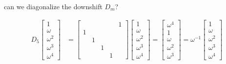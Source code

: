 \documentclass[10pt,
               svgnames,
               hyperref={colorlinks,citecolor=DeepPink4,linkcolor=FireBrick,urlcolor=Maroon},
               usepdftitle=false]{beamer}
\begin{document}
\begin{frame}{can we diagonalize the downshift $D_m$?}
\begin{itemize}
{\begin{align*}
D_5 \begin{bmatrix} 1 \\ \omega \\ \omega^2 \\ \omega^3 \\ \omega^4 \end{bmatrix} &= \begin{bmatrix} & & & & 1 \\ 1 & & & & \\ & 1 & & & \\ & & 1 & & \\ & & & 1 & \end{bmatrix} \begin{bmatrix} 1 \\ \omega \\ \omega^2 \\ \omega^3 \\ \omega^4 \end{bmatrix} = \begin{bmatrix} \omega^4 \\ 1 \\ \omega \\ \omega^2 \\ \omega^3 \end{bmatrix} = \omega^{-1} \begin{bmatrix} 1 \\ \omega \\ \omega^2 \\ \omega^3 \\ \omega^4 \end{bmatrix} \\

\end{align*}}
\end{itemize}
\end{frame}
\end{document}
